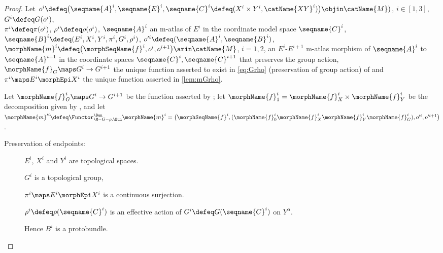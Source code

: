 \documentclass{article}
\begin{document}
\begin{theorem}
\begin{proof}
Let
$
  o^i \defeq
  \bigl (
    \seqname{A}^i,
    \seqname{E}^i,
    \seqname{C}^i \defeq (X^i \times Y^i, \catName{XY}^i)
  \bigr )
  \objin \catName{M})
$,
$i \in [1,3]$,
$G^i \defeq G(o^i)$, \\
$\pi^i \defeq \pi(o^i)$,
$\rho^i \defeq \rho(o^i)$,
$\seqname{A}^i$ an m-atlas of $E^i$ in the coordinate model space $\seqname{C}^i$, \\
$
  \seqname{B}^i \defeq
    (
      E^i,
      X^i,
      Y^i,
      \pi^i,
      G^i,
      \rho^i
    )
$,
$
  o'^i \defeq
  (
    \seqname{A}^i,
    \seqname{B}^i
  )
$,
$
  \morphName{m}^i \defeq
    \bigl (
      \morphSeqName{f}^i,
      o^i,
      o^{i+1}
    \bigr )
    \arin \catName{M}
$, $i=1,2$,
an $E^i$-$E^{i+1}$ m-atlas morphism of $\seqname{A}^i$ to
$\seqname{A}^{i+1}$ in the coordinate spaces
$\seqname{C}^i, \seqname{C}^{i+1}$ that preserves the group action,
$\morphName{f}_G \maps G^i \to G^{i+1}$ the unique function asserted to
exist in \cref{eq:Grho} (preservation of group action) of
 and $\pi^i \maps E^i \morphEpi X^i$ the unique
function asserted in \cref{lem:mGrho}.

Let $\morphName{f}^i_G \maps G^i \to G^{i+1}$ be the function asserted by
; let
$\morphName{f}^i_1 = \morphName{f}^i_X \times \morphName{f}^i_Y$ be the
decomposition given by , and let
$
  \morphName{m}'^i \defeq
  \Functor^\Bun_{\M-G-\rho,\Bun} \morphName{m}^i = \\
    \bigl (
      \morphSeqName{f}^i,
      (
        \morphName{f}^i_0
        \morphName{f}^i_X
        \morphName{f}^i_Y
        \morphName{f}^i_G
      ),
      o'^i,
      o'^{i+1}
    \bigr )
$.

\begin{description}
\item[Preservation of endpoints:]
$E^i$, $X^i$ and $Y^i$ are topological spaces.

$ G^i$ is a topological group,

$\pi^i \maps E^i \morphEpi X^i$ is a continuous surjection.

$\rho^i \defeq \rho(\seqname{C}^i)$ is an effective action of
$G^i \defeq G(\seqname{C}^i)$ on $Y^\alpha$.

Hence $B^i$ is a protobundle.


\end{description}
\end{proof}
\end{theorem}
\end{document}
